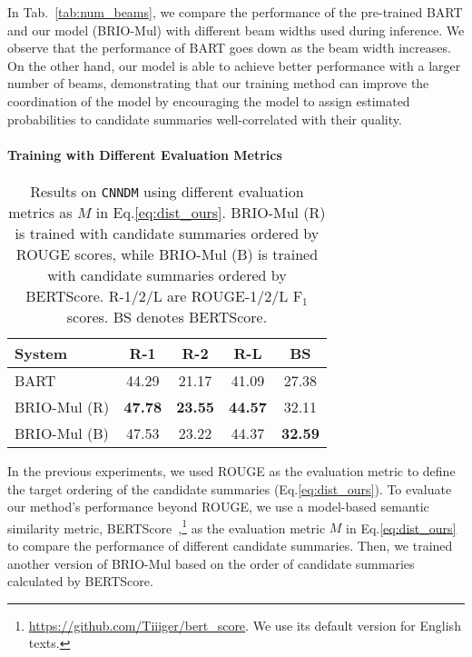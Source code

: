 \documentclass[11pt]{article}
\newcommand{\model}{BRIO\xspace}
\begin{document}
In Tab.~\ref{tab:num_beams}, we compare the performance of the pre-trained BART and our model (\model-Mul) with different beam widths used during inference.
We observe that the performance of BART goes down as the beam width increases.
On the other hand, our model is able to achieve better performance with a larger number of beams, demonstrating that our training method can improve the coordination of the model by encouraging the model to assign estimated probabilities to candidate summaries well-correlated with their quality.



\paragraph{Training with Different Evaluation Metrics}

\begin{table}[t!]
\centering
\small
\begin{tabular}{lcccc}
\toprule
\textbf{System} & \textbf{R-1} & \textbf{R-2} & \textbf{R-L} & \textbf{BS} \\
\midrule
 BART & 44.29 & 21.17 & 41.09 & 27.38\\
 \model-Mul (R) & \textbf{47.78} & \textbf{23.55} & \textbf{44.57} & 32.11\\
 \model-Mul (B) & 47.53 & 23.22 & 44.37 & \textbf{32.59} \\
\bottomrule
\end{tabular}
\caption{\label{tab:bertscore} Results on \texttt{CNNDM} using different evaluation metrics as $M$ in Eq.\ref{eq:dist_ours}.
\model-Mul (R) is trained with candidate summaries ordered by ROUGE scores, while \model-Mul (B) is trained with candidate summaries ordered by BERTScore.
R-1/2/L are ROUGE-1/2/L F$_1$ scores.
BS denotes BERTScore.}
\end{table}


In the previous experiments, we used ROUGE as the evaluation metric to define the target ordering of the candidate summaries (Eq.\ref{eq:dist_ours}).
To evaluate our method's performance beyond ROUGE, we use a model-based semantic similarity metric, BERTScore~\citep{Zhang*2020BERTScore:},\footnote{\url{https://github.com/Tiiiger/bert_score}. We use its default version for English texts.} as the evaluation metric $M$ in Eq.\ref{eq:dist_ours} to compare the performance of different candidate summaries.
Then, we trained another version of \model-Mul based on the order of candidate summaries calculated by BERTScore.
\end{document}
